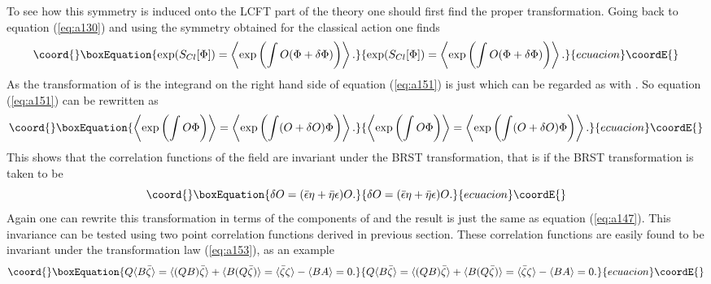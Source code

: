 \documentclass[a4paper,11pt]{article}
\begin{document}
To see how this symmetry is induced onto the LCFT part of the
theory one should first find the proper transformation. Going back
to equation (\ref{eq:a130}) and using the symmetry obtained for
the classical action one finds
\begin{equation}\coord{}\boxEquation{\label{eq:a151}
\exp(S_{Cl}[\Phi])= \left\langle\exp \left(\int O(\Phi+
\delta\Phi)\right) \right\rangle.
}{\exp(S_{Cl}[\Phi])= \left\langle\exp \left(\int O(\Phi+
\delta\Phi)\right) \right\rangle.
}{ecuacion}\coordE{}\end{equation}
As the transformation of \myHighlight{$\Phi$}\coordHE{} is \myHighlight{$(\bar{\epsilon}\eta +
\bar{\eta}\epsilon)\Phi$}\coordHE{} the integrand on the right hand side of
equation (\ref{eq:a151}) is just \coordHE{} which can be regarded as \coordHE{} with \coordHE{}. So equation (\ref{eq:a151}) can be
rewritten as
\begin{equation}\coord{}\boxEquation{\label{eq:a152}
\left\langle\exp\left(\int O\Phi\right)\right\rangle=
\left\langle\exp\left(\int(O+\delta O) \Phi\right)\right\rangle.
}{\left\langle\exp\left(\int O\Phi\right)\right\rangle=
\left\langle\exp\left(\int(O+\delta O) \Phi\right)\right\rangle.
}{ecuacion}\coordE{}\end{equation}
This shows that the correlation functions of the \coordHE{} field are
invariant under the BRST transformation, that is \coordHE{} if the BRST transformation is taken to
be
\begin{equation}\coord{}\boxEquation{\label{eq:a153}
\delta O=(\bar{\epsilon}\eta + \bar{\eta}\epsilon)O.
}{\delta O=(\bar{\epsilon}\eta + \bar{\eta}\epsilon)O.
}{ecuacion}\coordE{}\end{equation}
Again one can rewrite this transformation in terms of the
components of \coordHE{} and the result is just the same as equation
(\ref{eq:a147}). This invariance can be tested using two point
correlation functions derived in previous section. These
correlation functions are easily found to be invariant under the
transformation law (\ref{eq:a153}), as an example
\begin{equation}\coord{}\boxEquation{\label{eq:a154}
Q \langle B \bar{\zeta}\rangle= \langle (Q B) \bar{\zeta}\rangle+
\langle B (Q \bar{\zeta}) \rangle= \langle\bar{\zeta}\zeta\rangle
- \langle BA\rangle=0.
}{Q \langle B \bar{\zeta}\rangle= \langle (Q B) \bar{\zeta}\rangle+
\langle B (Q \bar{\zeta}) \rangle= \langle\bar{\zeta}\zeta\rangle
- \langle BA\rangle=0.
}{ecuacion}\coordE{}\end{equation}
\end{document}

